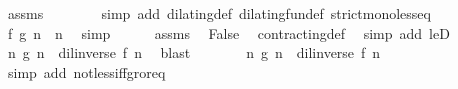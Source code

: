 \begin{isabellebody}
\ assms{\isacharparenleft}{}{\isacharparenright}\isanewline
\ \ \ \ \ \ \isamarkupfalse%
\ {\isacharparenleft}simp\ add{\isacharcolon}\ dilating{\isacharunderscore}def\ dilating{\isacharunderscore}fun{\isacharunderscore}def\ strict{\isacharunderscore}mono{\isacharunderscore}less{\isacharunderscore}eq{\isacharparenright}\isanewline
\ \ \ \ \isamarkupfalse%
\ {\isacartoucheopen}f\ {\isacharparenleft}g\ n{\isacharparenright}\ {\isachargreater}\ n{\isacartoucheclose}\ \isamarkupfalse%
\ simp\isanewline
\ \ \ \ \isamarkupfalse%
\ assms{\isacharparenleft}{}{\isacharparenright}\ \isamarkupfalse%
\ False\ \isamarkupfalse%
\ contracting{\isacharunderscore}def\ \isamarkupfalse%
\ {\isacharparenleft}simp\ add{\isacharcolon}\ leD{\isacharparenright}\isanewline
\ \ \isacommand{{\isacharbraceright}}\isamarkupfalse%
\ \isamarkupfalse%
\ {}{\isacharcolon}{\isacartoucheopen}{\isasymAnd}n{\isachardot}\ {\isasymnot}{\isacharparenleft}g\ n\ {\isachargreater}\ {\isacharparenleft}dil{\isacharunderscore}inverse\ f{\isacharparenright}\ n{\isacharparenright}{\isacartoucheclose}\ \isamarkupfalse%
\ blast\isanewline
\ \ \isamarkupfalse%
\ {}\ {}\ \isamarkupfalse%
\ {\isacartoucheopen}{\isasymAnd}n{\isachardot}\ g\ n\ {\isacharequal}\ {\isacharparenleft}dil{\isacharunderscore}inverse\ f{\isacharparenright}\ n{\isacartoucheclose}\ \isamarkupfalse%
\ {\isacharparenleft}simp\ add{\isacharcolon}\ not{\isacharunderscore}less{\isacharunderscore}iff{\isacharunderscore}gr{\isacharunderscore}or{\isacharunderscore}eq{\isacharparenright}\isanewline
{}\isamarkupfalse%
%
\endisatagproof
{\isafoldproof}%
%
\isadelimproof
\isanewline
%
\endisadelimproof
%
\isadelimtheory
\isanewline
%
\endisadelimtheory
%
\isatagtheory
{}\isamarkupfalse%
%
\endisatagtheory
{\isafoldtheory}%
%
\isadelimtheory
%
\endisadelimtheory
%
\end{isabellebody}%
\endinput
